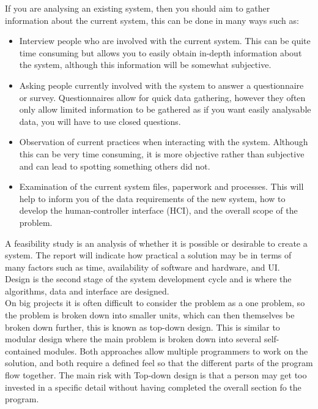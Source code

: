   If you are analysing an existing system, then you should aim to gather information about the current system, this can be done in many ways such as:
  \begin{itemize}
    \setlength\itemsep{0em}
    \item Interview people who are involved with the current system.
      \subitem This can be quite time consuming but allows you to easily obtain in-depth information about the system, although this information will be somewhat subjective.
    \item Asking people currently involved with the system to answer a questionnaire or survey.
      \subitem Questionnaires allow for quick data gathering, however they often only allow limited information to be gathered as if you want easily analysable data, you will have to use closed questions.
    \item Observation of current practices when interacting with the system.
      \subitem Although this can be very time consuming, it is more objective rather than subjective and can lead to spotting something others did not.
    \item Examination of the current system files, paperwork and processes.
      \subitem This will help to inform you of the data requirements of the new system, how to develop the human-controller interface (HCI), and the overall scope of the problem.
  \end{itemize}
  A feasibility study is an analysis of whether it is possible or desirable to create a system. The report will indicate how practical a solution may be in terms of many factors such as time, availability of software and hardware, and UI.\\
   Design is the second stage of the system development cycle and is where the algorithms, data and interface are designed.\\
  On big projects it is often difficult to consider the problem as a one problem, so the problem is broken down into smaller units, which can then themselves be broken down further, this is known as top-down design. This is similar to modular design where the main problem is broken down into several self-contained modules. Both approaches allow multiple programmers to work on the solution, and both require a defined feel so that the different parts of the program flow together. The main risk with Top-down design is that a person may get too invested in a specific detail without having completed the overall section fo the program.\\
